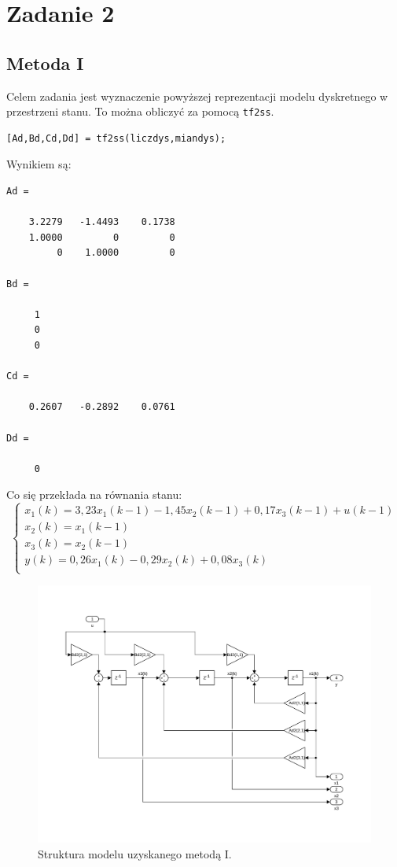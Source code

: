 \section{Zadanie 2}
\subsection{Metoda I}
Celem zadania jest wyznaczenie powyższej reprezentacji modelu dyskretnego w przestrzeni stanu. To można obliczyć za pomocą \texttt{tf2ss}.
\begin{verbatim}
[Ad,Bd,Cd,Dd] = tf2ss(liczdys,miandys);
\end{verbatim}
Wynikiem są:
\begin{verbatim}
Ad =

    3.2279   -1.4493    0.1738
    1.0000         0         0
         0    1.0000         0
         
Bd =

     1
     0
     0

Cd =

    0.2607   -0.2892    0.0761
    
Dd =

     0
\end{verbatim}
Co się przekłada na równania stanu:
\[
\left\{
\begin{array}{l}
	x_1(k)= 3,23x_1(k-1) -1,45x_2(k-1) +0,17x_3(k-1) + u(k-1) \\
	x_2(k)= x_1(k-1) \\
	x_3(k)= x_2(k-1) \\
	y(k)= 0,26x_1(k) -0,29x_2(k) + 0,08x_3(k) \\ 
\end{array}
\right.
\]
\begin{figure}[H]
\centering
 \includegraphics[width=\textwidth]{img/obj1.pdf}
\caption{Struktura modelu uzyskanego metodą I.}
\end{figure} 

